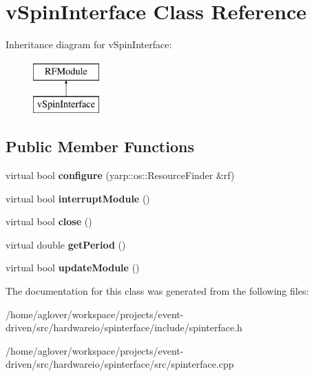 \hypertarget{classvSpinInterface}{}\section{v\+Spin\+Interface Class Reference}
\label{classvSpinInterface}
Inheritance diagram for v\+Spin\+Interface\+:\begin{figure}[H]
\begin{center}
\leavevmode
\includegraphics[height=2.000000cm]{classvSpinInterface}
\end{center}
\end{figure}
\subsection*{Public Member Functions}
\begin{DoxyCompactItemize}
\item 
virtual bool {\bfseries configure} (yarp\+::os\+::\+Resource\+Finder \&rf)\hypertarget{classvSpinInterface_afa8c4507f693729d5bf386e1190f5fbd}{}\label{classvSpinInterface_afa8c4507f693729d5bf386e1190f5fbd}

\item 
virtual bool {\bfseries interrupt\+Module} ()\hypertarget{classvSpinInterface_aa753c1ae6164708bea1fc3f01cd7f7b9}{}\label{classvSpinInterface_aa753c1ae6164708bea1fc3f01cd7f7b9}

\item 
virtual bool {\bfseries close} ()\hypertarget{classvSpinInterface_a832b19fa38602881e73cb5cea22ccb10}{}\label{classvSpinInterface_a832b19fa38602881e73cb5cea22ccb10}

\item 
virtual double {\bfseries get\+Period} ()\hypertarget{classvSpinInterface_a1addee84aa2d49ce627dd75b10a41f56}{}\label{classvSpinInterface_a1addee84aa2d49ce627dd75b10a41f56}

\item 
virtual bool {\bfseries update\+Module} ()\hypertarget{classvSpinInterface_a851d85f358a3225b18700cc2657eddff}{}\label{classvSpinInterface_a851d85f358a3225b18700cc2657eddff}

\end{DoxyCompactItemize}


The documentation for this class was generated from the following files\+:\begin{DoxyCompactItemize}
\item 
/home/aglover/workspace/projects/event-\/driven/src/hardwareio/spinterface/include/spinterface.\+h\item 
/home/aglover/workspace/projects/event-\/driven/src/hardwareio/spinterface/src/spinterface.\+cpp\end{DoxyCompactItemize}
